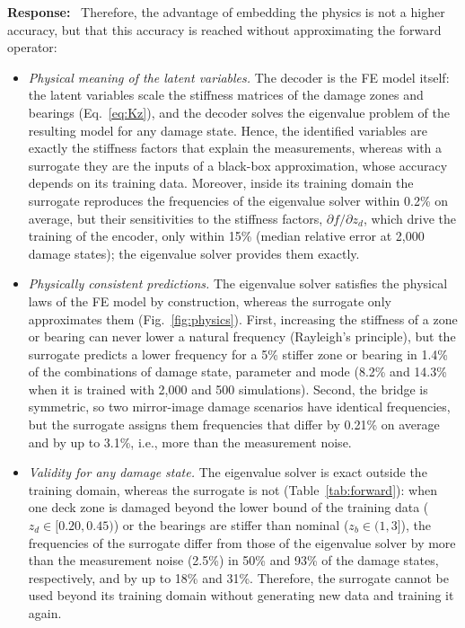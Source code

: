 \documentclass[11pt]{article}
\newenvironment{response}{\par\smallskip\noindent\color{resp}\textbf{Response:}\ }{\par}
\begin{document}
\begin{response}
	Therefore, the advantage of embedding the physics is not a higher accuracy, but that this accuracy is reached without approximating the forward operator:
	\begin{itemize}[leftmargin=*]
		\item \emph{Physical meaning of the latent variables.} The decoder is the FE model itself: the latent variables scale the stiffness matrices of the damage zones and bearings (Eq.~\eqref{eq:Kz}), and the decoder solves the eigenvalue problem of the resulting model for any damage state. Hence, the identified variables are exactly the stiffness factors that explain the measurements, whereas with a surrogate they are the inputs of a black-box approximation, whose accuracy depends on its training data. Moreover, inside its training domain the surrogate reproduces the frequencies of the eigenvalue solver within 0.2\% on average, but their sensitivities to the stiffness factors, $\partial f/\partial z_d$, which drive the training of the encoder, only within 15\% (median relative error at 2,000 damage states); the eigenvalue solver provides them exactly.
		\item \emph{Physically consistent predictions.} The eigenvalue solver satisfies the physical laws of the FE model by construction, whereas the surrogate only approximates them (Fig.~\ref{fig:physics}). First, increasing the stiffness of a zone or bearing can never lower a natural frequency (Rayleigh's principle), but the surrogate predicts a lower frequency for a 5\% stiffer zone or bearing in 1.4\% of the combinations of damage state, parameter and mode (8.2\% and 14.3\% when it is trained with 2,000 and 500 simulations). Second, the bridge is symmetric, so two mirror-image damage scenarios have identical frequencies, but the surrogate assigns them frequencies that differ by 0.21\% on average and by up to 3.1\%, i.e., more than the measurement noise.
		\item \emph{Validity for any damage state.} The eigenvalue solver is exact outside the training domain, whereas the surrogate is not (Table~\ref{tab:forward}): when one deck zone is damaged beyond the lower bound of the training data ($z_d\in[0.20,0.45)$) or the bearings are stiffer than nominal ($z_{b}\in(1,3]$), the frequencies of the surrogate differ from those of the eigenvalue solver by more than the measurement noise (2.5\%) in 50\% and 93\% of the damage states, respectively, and by up to 18\% and 31\%. Therefore, the surrogate cannot be used beyond its training domain without generating new data and training it again.

\end{itemize}
\end{response}
\end{document}
